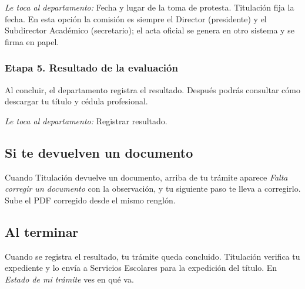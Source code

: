 \emph{Le toca al departamento:} Fecha y lugar de la toma de protesta. Titulación fija la fecha. En esta opción la comisión es siempre el Director (presidente) y el Subdirector Académico (secretario); el acta oficial se genera en otro sistema y se firma en papel.
\subsubsection*{Etapa 5. Resultado de la evaluación}
Al concluir, el departamento registra el resultado. Después podrás consultar cómo descargar tu título y cédula profesional.

\emph{Le toca al departamento:} Registrar resultado. 
\subsection{Si te devuelven un documento}
Cuando Titulación devuelve un documento, arriba de tu trámite aparece \emph{Falta corregir un documento} con la observación, y tu siguiente paso te lleva a corregirlo. Sube el PDF corregido desde el mismo renglón.
\subsection{Al terminar}
Cuando se registra el resultado, tu trámite queda concluido. Titulación verifica tu expediente y lo envía a Servicios Escolares para la expedición del título. En \emph{Estado de mi trámite} ves en qué va.
